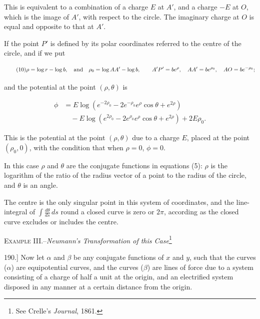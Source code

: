 \documentclass[11pt,a4paper]{article}
\begin{document}
This is equivalent to a combination of a charge $E$ at $A'$, and a charge $-E$ at $O$, which is the image of $A'$, with respect to the circle. The imaginary charge at $O$ is equal and opposite to that at $A'$.

If the point $P'$ is defined by its polar coordinates referred to the centre of the circle, and if we put

\begin{equation}\tag{10}
\rho=\log r-\log b,\quad
\hbox{and}\quad
\rho_0=\log AA'-\log b,
\qquad
A'P'=be^\rho,\quad
AA'=be^{\rho_0},\quad
AO=be^{-\rho_0};
\end{equation}

and the potential at the point  $(\rho, \theta)$  is

\begin{equation}\tag{11}
\begin{split}
\phi
&= E\log\left(e^{-2\rho_0}-2e^{-\rho_0}e^\rho\cos\theta+e^{2\rho}\right)\\
&\quad
-E\log\left(e^{2\rho_0}-2e^{\rho_0}e^\rho\cos\theta+e^{2\rho}\right)
+2E\rho_0.
\end{split}
\end{equation}

This is the potential at the point $(\rho,\theta)$ due to a charge $E$, placed at the point $(\rho_0,0)$, with the condition that when $\rho=0$, $\phi=0$.

In this case $\rho$ and $\theta$ are the conjugate functions in equations (5): $\rho$ is the logarithm of the ratio of the radius vector of a point to the radius of the circle, and $\theta$ is an angle.

The centre is the only singular point in this system of coordinates, and the line-integral of $\int \frac{d\theta}{ds}\,ds$ round a closed curve is zero or $2\pi$, according as the closed curve excludes or includes the centre.

\begin{center}
\textsc{Example III.}--\textit{Neumann's Transformation of this Case}\footnote{See Crelle's \textit{Journal}, 1861.}
\end{center}

190.] Now let $\alpha$ and $\beta$ be any conjugate functions of $x$ and $y$, such that the curves ($\alpha$) are equipotential curves, and the curves ($\beta$) are lines of force due to a system consisting of a charge of half a unit at the origin, and an electrified system disposed in any manner at a certain distance from the origin.
\end{document}

